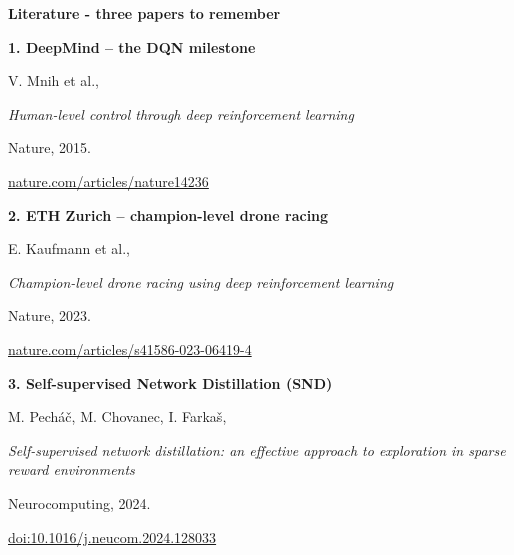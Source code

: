 \documentclass[xcolor=dvipsnames]{beamer}
\begin{document}
\begin{frame}{\bf Literature - three papers to remember}

  \small

  \textbf{1. DeepMind -- the DQN milestone}

  V. Mnih et al.,

  \textit{Human-level control through deep reinforcement learning}

  Nature, 2015.

  \href{https://www.nature.com/articles/nature14236}
       {nature.com/articles/nature14236}

  \vspace{0.25cm}
  \textbf{2. ETH Zurich -- champion-level drone racing}

  E. Kaufmann et al.,

  \textit{Champion-level drone racing using deep reinforcement learning}

  Nature, 2023.

  \href{https://www.nature.com/articles/s41586-023-06419-4}
       {nature.com/articles/s41586-023-06419-4}

  \vspace{0.25cm}
  \textbf{3. Self-supervised Network Distillation (SND)}

  M. Pecháč, M. Chovanec, I. Farkaš,

  \textit{Self-supervised network distillation: an effective
  approach to exploration in sparse reward environments}

  Neurocomputing, 2024.

  \href{https://doi.org/10.1016/j.neucom.2024.128033}
       {doi:10.1016/j.neucom.2024.128033}

\end{frame}
\end{document}
